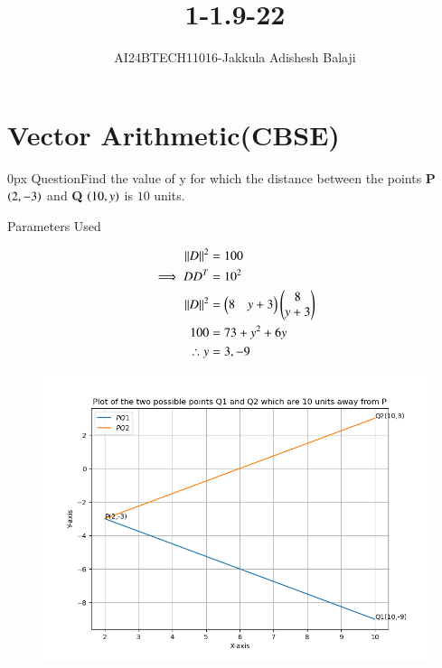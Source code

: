 \documentclass[journal]{IEEEtran}
\begin{document}

\renewcommand{\thefigure}{\theenumi}
\renewcommand{\thetable}{\theenumi}
\setlength{\intextsep}{10pt} %
\renewcommand{\thetable}{\theenumi}
\title{1-1.9-22}

\author{AI24BTECH11016-Jakkula Adishesh Balaji}
\maketitle
\bigskip
\section*{\textbf{Vector Arithmetic(CBSE)}}
         \parindent 0px
         QuestionFind the value of y for which the distance between the points \textbf{P} $\left(2,-3\right)$ and \textbf{Q} $\left(10,y\right)$ is $10$ units. \\
	\solution
	\begin{table}[h!]
         	\centering
         	
         	\caption{Parameters Used}
         	\label{tab1.9.22}
         \end{table}
	\begin{align}
	\left\lVert D\right\rVert^2 &= 100 \\
	\implies D{D}^{T} &= {10}^{2} \\
	\left\lVert D\right\rVert^{2} &= \begin{pmatrix}8 & y+3\end{pmatrix}\begin{pmatrix}8 \\ y+3\end{pmatrix} \\
       	100 &= 73 + y^{2} + 6y \\
 	\therefore y &= 3,-9 \\
	\end{align}
	\begin{figure}[h]
		\centering
		\includegraphics[scale=0.6]{figs/plot.png}
		\label{Fig}
	\end{figure}
\end{document}
